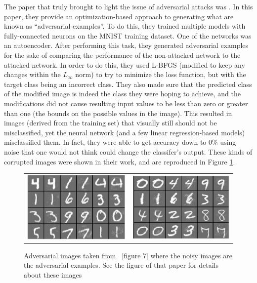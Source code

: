 The paper that truly brought to light the issue of adversarial attacks was
\cite{szegedy2014intriguing}. In this paper, they provide an optimization-based approach to
generating what are known as ``adversarial examples''. To do this, they trained multiple models with
fully-connected neurons on the MNIST training dataset\cite{lecun}. One of the networks was  an
autoencoder. After performing this task, they generated adversarial examples for the sake of
comparing the performance of the non-attacked network to the attacked network. In order to do this,
they used L-BFGS\cite{lbfgs} (modified to keep any changes within the $L_{\infty}$ norm) to try to
minimize the loss function, but with the target class being an incorrect class. They also made sure
that the predicted class of the modified image is indeed the class they were hoping to achieve, and
the modifications did not cause resulting input values to be less than zero or greater than one (the
bounds on the possible values in the image). This resulted in images (derived from the training set)
that visually still should not be misclassified, yet the neural network (and a few linear
regression-based models) misclassified them. In fact, they were able to get accuracy down to 0\%
using noise that one would not think could change the classifer's output. These kinds of corrupted
images were shown in their work, and are reproduced in Figure \ref{adversarialexamplespictures}.

\begin{figure}
    \begin{center}
        \begin{tabular}{c c}
            \includegraphics[width = 3in]{Friendly/LaTeX/figures/grid1.png} & \includegraphics[width = 3in]{Friendly/LaTeX/figures/grid2.png}
        \end{tabular}
    \end{center}
    \caption{Adversarial images taken from ~\cite{szegedy2014intriguing}[figure 7] where the noisy
             images are the adversarial examples. See the figure of that paper for details about
             these images}
    \label{adversarialexamplespictures}
\end{figure}

